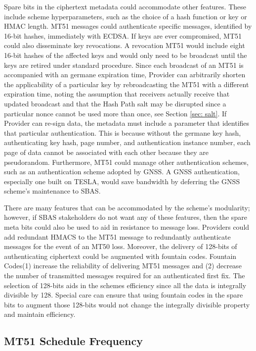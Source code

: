 \documentclass[letterpaper,times]{IONconf/IONconf}
\begin{document}
Spare bits in the ciphertext metadata could accommodate other features.
These include scheme hyperparameters, such as the choice of a hash function or key or HMAC length.
MT51 messages could authenticate specific messages, identified by 16-bit hashes, immediately with ECDSA.
If keys are ever compromised, MT51 could also disseminate key revocations.
A revocation MT51 would include eight 16-bit hashes of the affected keys and would only need to be broadcast until the keys are retired under standard procedure.
Since each broadcast of an MT51 is accompanied with an germane expiration time, Provider can arbitrarily shorten the applicability of a particular key by rebroadcasting the MT51 with a different expiration time, noting the assumption that receivers actually receive that updated broadcast and that the Hash Path salt may be disrupted since a particular nonce cannot be used more than once, see Section \ref{sec: salt}. 
If Provider can re-sign data, the metadata must include a parameter that identifies that particular authentication.
This is because without the germane key hash, authenticating key hash, page number, and authentication instance number, each page of data cannot be associated with each other because they are pseudorandom.
Furthermore, MT51 could manage other authentication schemes, such as an authentication scheme adopted by GNSS.
A GNSS authentication, especially one built on TESLA, would save bandwidth by deferring the GNSS scheme's maintenance to SBAS.

There are many features that can be accommodated by the scheme's modularity; however, if SBAS stakeholders do not want any of these features, then the spare meta bits could also be used to aid in resistance to message loss.
Providers could add redundant HMACS to the MT51 message to redundantly authenticate messages for the event of an MT50 loss.
Moreover, the delivery of 128-bits of authenticating ciphertext could be augmented with fountain codes.
Fountain Codes(1) increase the reliability of delivering MT51 messages and (2) decrease the number of transmitted messages required for an authenticated first fix.
The selection of 128-bits aids in the schemes efficiency since all the data is integrally divisible by 128.
Special care can ensure that using fountain codes in the spare bits to augment those 128-bits would not change the integrally divisible property and maintain efficiency.

\subsection{MT51 Schedule Frequency} \label{sec: MT51 Freq}
\end{document}
